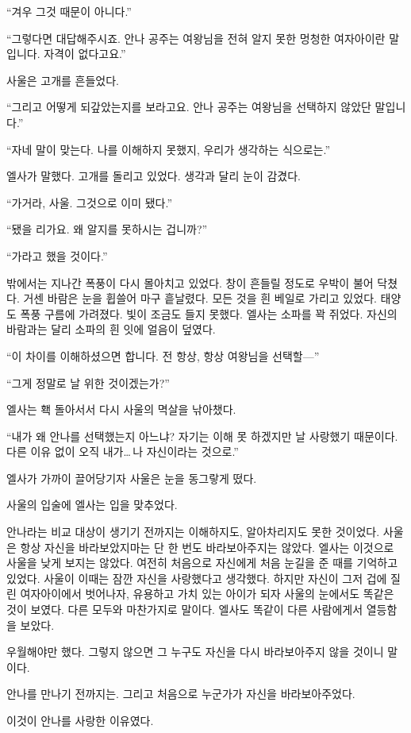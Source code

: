``겨우 그것 때문이 아니다.''

``그렇다면 대답해주시죠. 안나 공주는 여왕님을 전혀 알지 못한 멍청한 여자아이란 말입니다. 자격이 없다고요.''

사울은 고개를 흔들었다.

``그리고 어떻게 되갚았는지를 보라고요. 안나 공주는 여왕님을 선택하지 않았단 말입니다.''

``자네 말이 맞는다. 나를 이해하지 못했지, 우리가 생각하는 식으로는.''

엘사가 말했다. 고개를 돌리고 있었다. 생각과 달리 눈이 감겼다.

``가거라, 사울. 그것으로 이미 됐다.''

``됐을 리가요. 왜 알지를 못하시는 겁니까?''

``가라고 했을 것이다.''

밖에서는 지나간 폭풍이 다시 몰아치고 있었다. 창이 흔들릴 정도로 우박이 불어 닥쳤다. 거센 바람은 눈을 휩쓸어 마구 흩날렸다. 모든 것을 흰 베일로 가리고 있었다. 태양도 폭풍 구름에 가려졌다. 빛이 조금도 들지 못했다. 엘사는 소파를 꽉 쥐었다. 자신의 바람과는 달리 소파의 흰 잇에 얼음이 덮였다.

``이 차이를 이해하셨으면 합니다. 전 항상, 항상 여왕님을 선택할—''

``그게 정말로 날 위한 것이겠는가?''

엘사는 홱 돌아서서 다시 사울의 멱살을 낚아챘다.

``내가 왜 안나를 선택했는지 아느냐? 자기는 이해 못 하겠지만 날 사랑했기 때문이다. 다른 이유 없이 오직 내가\ldots\,나 자신이라는 것으로.''

엘사가 가까이 끌어당기자 사울은 눈을 동그랗게 떴다.

사울의 입술에 엘사는 입을 맞추었다.

안나라는 비교 대상이 생기기 전까지는 이해하지도, 알아차리지도 못한 것이었다. 사울은 항상 자신을 바라보았지마는 단 한 번도 바라보아주지는 않았다. 엘사는 이것으로 사울을 낮게 보지는 않았다. 여전히 처음으로 자신에게 처음 눈길을 준 때를 기억하고 있었다. 사울이 이때는 잠깐 자신을 사랑했다고 생각했다. 하지만 자신이 그저 겁에 질린 여자아이에서 벗어나자, 유용하고 가치 있는 아이가 되자 사울의 눈에서도 똑같은 것이 보였다. 다른 모두와 마찬가지로 말이다. 엘사도 똑같이 다른 사람에게서 열등함을 보았다.

우월해야만 했다. 그렇지 않으면 그 누구도 자신을 다시 바라보아주지 않을 것이니 말이다.

안나를 만나기 전까지는. 그리고 처음으로 누군가가 자신을 바라보아주었다.

이것이 안나를 사랑한 이유였다.

